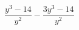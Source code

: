 \begin{ex}
	\begin{condition}
		\( \dfrac{y^3-14}{y^2}-\dfrac{3y^3-14}{y^2} \)
	\end{condition}
\end{ex}